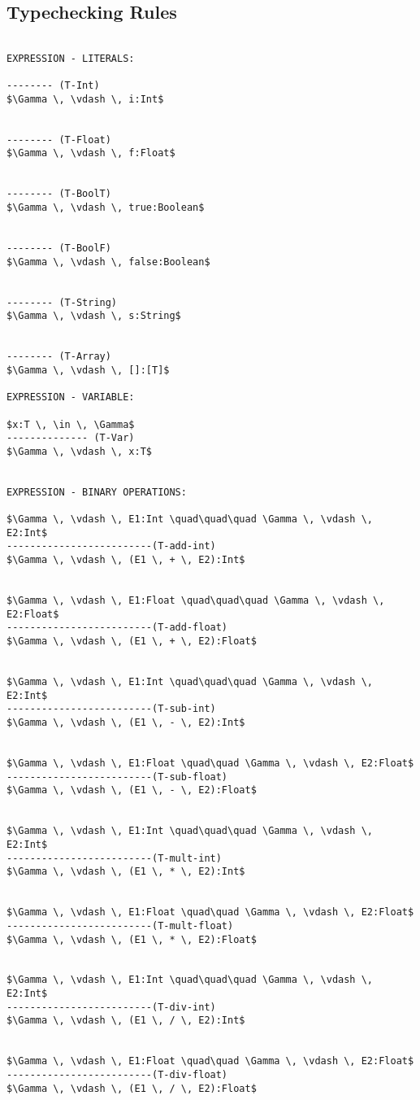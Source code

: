 \documentclass[11pt, a4paper]{article}
\begin{document}
\subsection*{Typechecking Rules}
\begin{lstlisting}

EXPRESSION - LITERALS:

-------- (T-Int)
$\Gamma \, \vdash \, i:Int$


-------- (T-Float)
$\Gamma \, \vdash \, f:Float$


-------- (T-BoolT)
$\Gamma \, \vdash \, true:Boolean$


-------- (T-BoolF)
$\Gamma \, \vdash \, false:Boolean$


-------- (T-String)
$\Gamma \, \vdash \, s:String$


-------- (T-Array)
$\Gamma \, \vdash \, []:[T]$

EXPRESSION - VARIABLE:

$x:T \, \in \, \Gamma$
-------------- (T-Var)
$\Gamma \, \vdash \, x:T$


EXPRESSION - BINARY OPERATIONS:

$\Gamma \, \vdash \, E1:Int \quad\quad\quad \Gamma \, \vdash \, E2:Int$
-------------------------(T-add-int)
$\Gamma \, \vdash \, (E1 \, + \, E2):Int$


$\Gamma \, \vdash \, E1:Float \quad\quad\quad \Gamma \, \vdash \, E2:Float$
-------------------------(T-add-float)
$\Gamma \, \vdash \, (E1 \, + \, E2):Float$


$\Gamma \, \vdash \, E1:Int \quad\quad\quad \Gamma \, \vdash \, E2:Int$
-------------------------(T-sub-int)
$\Gamma \, \vdash \, (E1 \, - \, E2):Int$


$\Gamma \, \vdash \, E1:Float \quad\quad \Gamma \, \vdash \, E2:Float$
-------------------------(T-sub-float)
$\Gamma \, \vdash \, (E1 \, - \, E2):Float$


$\Gamma \, \vdash \, E1:Int \quad\quad\quad \Gamma \, \vdash \, E2:Int$
-------------------------(T-mult-int)
$\Gamma \, \vdash \, (E1 \, * \, E2):Int$


$\Gamma \, \vdash \, E1:Float \quad\quad \Gamma \, \vdash \, E2:Float$
-------------------------(T-mult-float)
$\Gamma \, \vdash \, (E1 \, * \, E2):Float$


$\Gamma \, \vdash \, E1:Int \quad\quad\quad \Gamma \, \vdash \, E2:Int$
-------------------------(T-div-int)
$\Gamma \, \vdash \, (E1 \, / \, E2):Int$


$\Gamma \, \vdash \, E1:Float \quad\quad \Gamma \, \vdash \, E2:Float$
-------------------------(T-div-float)
$\Gamma \, \vdash \, (E1 \, / \, E2):Float$



\end{lstlisting}
\end{document}
